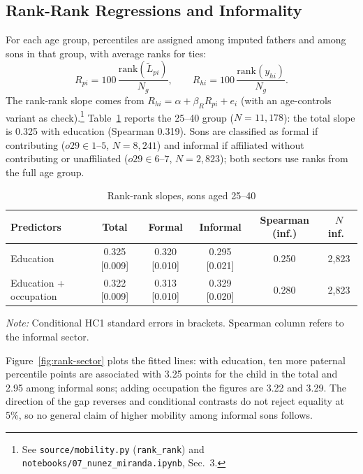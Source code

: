 \subsection{Rank-Rank Regressions and Informality}\label{sec:rank}
For each age group, percentiles are assigned among imputed fathers and among sons in that group, with average ranks for ties:
\begin{equation}
    R_{pi} = 100\,\frac{\mathrm{rank}(\widetilde{L}_{pi})}{N_g}, \qquad R_{hi} = 100\,\frac{\mathrm{rank}(y_{hi})}{N_g}.
    \label{eq:ranks}
\end{equation}
The rank-rank slope comes from $R_{hi} = \alpha + \beta_R R_{pi} + e_i$ (with an age-controls variant as check).\footnote{See \texttt{source/mobility.py} (\texttt{rank\_rank}) and \texttt{notebooks/07\_nunez\_miranda.ipynb}, Sec.~3.} Table~\ref{tab:mob-rank} reports the 25--40 group ($N=11{,}178$): the total slope is 0.325 with education (Spearman 0.319). Sons are classified as formal if contributing ($o29 \in 1$--$5$, $N=8{,}241$) and informal if affiliated without contributing or unaffiliated ($o29 \in 6$--$7$, $N=2{,}823$); both sectors use ranks from the full age group.

\begin{table}[H]
    \centering
    \caption{Rank-rank slopes, sons aged 25--40}\label{tab:mob-rank}
    \begin{tabular}{lccccc}
        \toprule
        Predictors & Total & Formal & Informal & Spearman (inf.) & $N$ inf.\ \\
        \midrule
        Education & 0.325 [0.009] & 0.320 [0.010] & 0.295 [0.021] & 0.250 & 2,823 \\
        Education + occupation & 0.322 [0.009] & 0.313 [0.010] & 0.329 [0.020] & 0.280 & 2,823 \\
        \bottomrule
    \end{tabular}
    \vspace{0.2em}
    \flushleft\footnotesize{\textit{Note:} Conditional HC1 standard errors in brackets. Spearman column refers to the informal sector.}
\end{table}

Figure~\ref{fig:rank-sector} plots the fitted lines: with education, ten more paternal percentile points are associated with 3.25 points for the child in the total and 2.95 among informal sons; adding occupation the figures are 3.22 and 3.29. The direction of the gap reverses and conditional contrasts do not reject equality at 5\%, so no general claim of higher mobility among informal sons follows.

